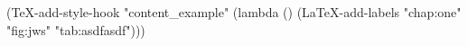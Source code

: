 (TeX-add-style-hook "content_example"
 (lambda ()
    (LaTeX-add-labels
     "chap:one"
     "fig:jws"
     "tab:asdfasdf")))

